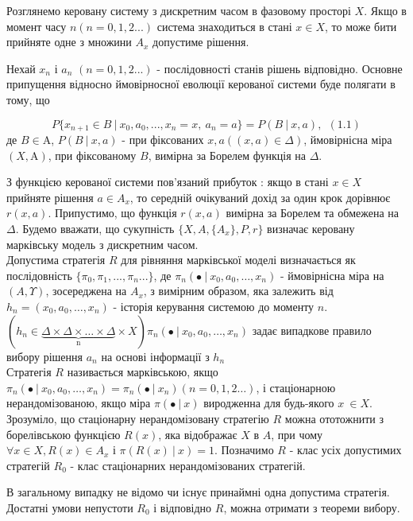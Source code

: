 \documentclass[a4paper, 14pt]{extarticle}
\newcommand{\Alpha}{\mathrm{A}}
\begin{document}
Розглянемо керовану систему з дискретним часом в фазовому просторі $ X $. Якщо в момент часу $ n (n = 0,1,2...)$ система знаходиться 
 в стані $ x \in X $, то може бити прийняте одне з множини $A_x$ допустиме рішення.\

Нехай $x_n$ і $a_n$ $(n = 0,1,2...)$ - послідовності станів рішень відповідно. Основне  припущення відносно ймовірносної еволюції керованої системи буде полягати в тому, що 

$$ P\lbrace x_{n+1} \in B \ | \ x_0,a_0,...,x_n =x, \ a_n=a\rbrace = P(B\ |\ x,a),	\ \ (1.1)$$ де $ B \in \Alpha $, $P(B \ | \ x, a)$ - при фіксованих $ x,a ((x,a) \in \Delta)$, ймовірнісна міра $(X,\Alpha)$, при фіксованому $ B $, вимірна за Борелем функція на $\Delta$.\

З функцією керованої системи пов'язаний прибуток : якщо в стані $x \in X$ прийняте рішення  $ a 
\in A_x$, то середній очікуваний дохід за один крок  дорівнює $r(x,a)$. Припустимо, що функція $r(x,a)$ вимірна за Борелем та обмежена на $\Delta$. Будемо вважати, що сукупність $ \lbrace X,A,\lbrace A_x \rbrace,P,r \rbrace$ визначає керовану марківську модель з дискретним часом.\\

Допустима стратегія $ R $ для рівняння марківської моделі визначається як послідовність $\lbrace\pi_0,\pi_1,...,\pi_n...\rbrace$, де $\pi_n ( \bullet \ | \ x_0,a_0,\ldots,x_n)$  - ймовірнісна міра на $(A,\Upsilon)$, зосереджена на $A_x$, з вимірним образом, яка залежить від $h_n=(x_0,a_0,\ldots,x_n)$ - історія керування системою до моменту $n$.\\
$(h_n \in \underbrace{\Delta \times \Delta \times \ldots \times \Delta}_{\text{n}} \times X) \pi_n(\bullet \ | \ x_0,a_0,\ldots,x_n)$ задає випадкове правило вибору рішення $a_n$ на основі інформації з $ h_n $\\

Стратегія $ R $ називається марківською, якщо $\pi_n(\bullet \ | \ x_0,a_0,\ldots,x_n) = \pi_n(\bullet \ | \ x_n) (n = 0,1,2\ldots)$, і стаціонарною нерандомізованою, якщо міра $\pi(\bullet \ | \ x)$ виродженна для будь-якого $x \  \in X$. Зрозуміло, що стаціонарну нерандомізовану стратегію $R$ можна ототожнити  з борелівською функцією $R(x)$, яка відображає  $X$ в $A$, при чому $ \forall x \in X, R(x) \in  A_x$ і $\pi(R(x)\ | \ x) = 1$. Позначимо $R$ - клас усіх допустимих стратегій $R_0$ - клас стаціонарних нерандомізованих стратегій.\par
В загальному випадку не відомо чи існує принаймні одна допустима стратегія. Достатні умови непустоти $R_0$ і відповідно $R$, можна отримати з теореми вибору.\newline \par
\end{document}
